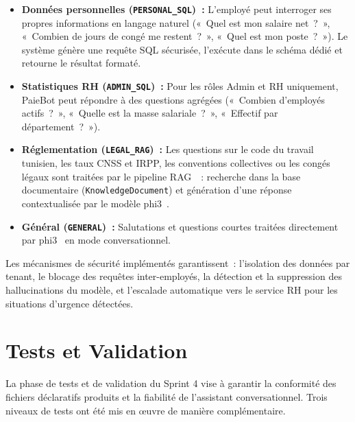 \begin{itemize}[label=\textbullet, leftmargin=0.6cm]
    \item \textbf{Données personnelles (\texttt{PERSONAL\_SQL})~:}
          L'employé peut interroger ses propres informations en langage
          naturel («~Quel est mon salaire net~?~», «~Combien de jours de
          congé me restent~?~», «~Quel est mon poste~?~»). Le système
          génère une requête SQL sécurisée, l'exécute dans le schéma
          dédié et retourne le résultat formaté.

    \item \textbf{Statistiques RH (\texttt{ADMIN\_SQL})~:}
          Pour les rôles Admin et RH uniquement, PaieBot peut répondre
          à des questions agrégées («~Combien d'employés actifs~?~»,
          «~Quelle est la masse salariale~?~», «~Effectif par
          département~?~»).

    \item \textbf{Réglementation (\texttt{LEGAL\_RAG})~:}
          Les questions sur le code du travail tunisien, les taux CNSS
          et IRPP, les conventions collectives ou les congés légaux
          sont traitées par le pipeline RAG~\cite{rag}~: recherche dans la base
          documentaire (\texttt{KnowledgeDocument}) et génération d'une
          réponse contextualisée par le modèle phi3~\cite{phi3}.

    \item \textbf{Général (\texttt{GENERAL})~:}
          Salutations et questions courtes traitées directement par
          phi3~\cite{phi3} en mode conversationnel.
\end{itemize}

Les mécanismes de sécurité implémentés garantissent~: l'isolation
des données par tenant, le blocage des requêtes inter-employés,
la détection et la suppression des hallucinations du modèle,
et l'escalade automatique vers le service RH pour les situations
d'urgence détectées.

\section{Tests et Validation}
\label{sec:s4-tests}

La phase de tests et de validation du Sprint 4 vise à garantir la
conformité des fichiers déclaratifs produits et la fiabilité de
l'assistant conversationnel. Trois niveaux de tests ont été mis en
œuvre de manière complémentaire.

